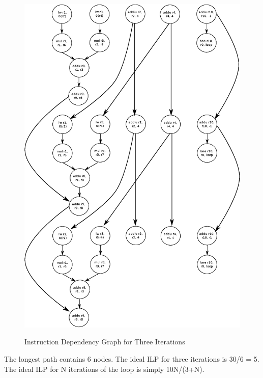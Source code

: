 \documentclass[10pt]{article}
\begin{document}
\begin{figure}[H]
\begin{center}
\includegraphics[scale=0.7]{threeiteri.eps}
\label{default}
\end{center}
\caption{Instruction Dependency Graph for Three Iterations}
\end{figure}
The longest path contains 6 nodes. 
The ideal ILP for three iterations is 30/6 = 5.\\

The ideal ILP for N iterations of the loop is simply 10N/(3+N). 
\end{document}

